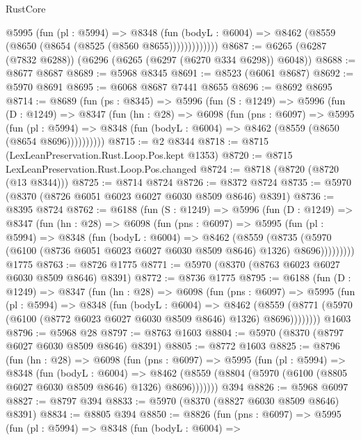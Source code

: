 \begin{lexlean}{RustCore}
\begin{coremodule}
{\begin{coremodule}
{{{{{{{{{{{{{{{{{{{{{{{{{{{{{{{{{{{{{{{{{{{{{              @5995
                (fun (pl : @5994) =>
                @8348
                  (fun (bodyL : @6004) =>
                  @8462 (@8559 (@8650 (@8654 (@8525 (@8560 @8655)))))))))))))
@8687 := @6265 (@6287 (@7832 @6288)) (@6296 (@6265 (@6297 (@6270 @334 @6298)) @6048))
@8688 := @8677 @8687
@8689 := @5968 @8345
@8691 := @8523 (@6061 @8687)
@8692 := @5970 @8691
@8695 := @6068 @8687 @7441 @8655
@8696 := @8692 @8695
@8714 := @8689
    (fun (ps : @8345) =>
    @5996
      (fun (S : @1249) =>
      @5996
        (fun (D : @1249) =>
        @8347
          (fun (hn : @28) =>
          @6098
            (fun (pns : @6097) =>
            @5995
              (fun (pl : @5994) =>
              @8348 (fun (bodyL : @6004) => @8462 (@8559 (@8650 (@8654 @8696))))))))))
@8715 := @2 @8344
@8718 := @8715 (LexLeanPreservation.Rust.Loop.Pos.kept @1353)
@8720 := @8715 LexLeanPreservation.Rust.Loop.Pos.changed
@8724 := @8718 (@8720 (@8720 (@13 @8344)))
@8725 := @8714 @8724
@8726 := @8372 @8724
@8735 := @5970 (@8370 (@8726 @6051 @6023 @6027 @6030 @8509 @8646) @8391)
@8736 := @8395 @8724
@8762 := @6188
    (fun (S : @1249) =>
    @5996
      (fun (D : @1249) =>
      @8347
        (fun (hn : @28) =>
        @6098
          (fun (pns : @6097) =>
          @5995
            (fun (pl : @5994) =>
            @8348
              (fun (bodyL : @6004) =>
              @8462
                (@8559
                  (@8735
                    (@5970 (@6100 (@8736 @6051 @6023 @6027 @6030 @8509 @8646) @1326) @8696)))))))))
    @1775
@8763 := @8726 @1775
@8771 := @5970 (@8370 (@8763 @6023 @6027 @6030 @8509 @8646) @8391)
@8772 := @8736 @1775
@8795 := @6188
    (fun (D : @1249) =>
    @8347
      (fun (hn : @28) =>
      @6098
        (fun (pns : @6097) =>
        @5995
          (fun (pl : @5994) =>
          @8348
            (fun (bodyL : @6004) =>
            @8462
              (@8559 (@8771 (@5970 (@6100 (@8772 @6023 @6027 @6030 @8509 @8646) @1326) @8696))))))))
    @1603
@8796 := @5968 @28
@8797 := @8763 @1603
@8804 := @5970 (@8370 (@8797 @6027 @6030 @8509 @8646) @8391)
@8805 := @8772 @1603
@8825 := @8796
    (fun (hn : @28) =>
    @6098
      (fun (pns : @6097) =>
      @5995
        (fun (pl : @5994) =>
        @8348
          (fun (bodyL : @6004) =>
          @8462 (@8559 (@8804 (@5970 (@6100 (@8805 @6027 @6030 @8509 @8646) @1326) @8696)))))))
    @394
@8826 := @5968 @6097
@8827 := @8797 @394
@8833 := @5970 (@8370 (@8827 @6030 @8509 @8646) @8391)
@8834 := @8805 @394
@8850 := @8826
    (fun (pns : @6097) =>
    @5995
      (fun (pl : @5994) =>
      @8348
        (fun (bodyL : @6004) =>
}}}}}}}}}}}}}}}}}}}}}}}}}}}}}}}}}}}}}}}}}}}}}
\end{coremodule}}
\end{coremodule}
\end{lexlean}

